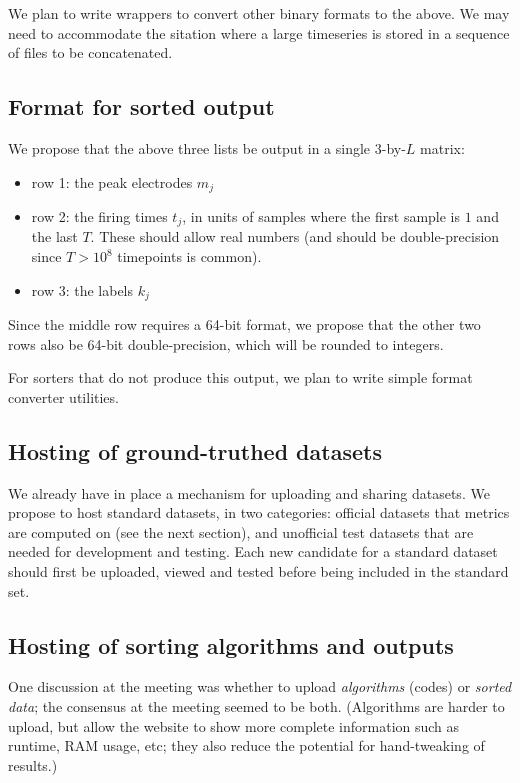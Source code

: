 \documentclass[10pt]{article}
\newcommand{\bi}{\begin{itemize}}
\newcommand{\ei}{\end{itemize}}
\begin{document}
We plan to write wrappers to convert other binary formats to the above.
We may need to
accommodate the sitation where a large timeseries is stored in a sequence of
files to be concatenated.

\subsection{Format for sorted output}

We propose that the above three lists be output in
a single $3$-by-$L$ matrix:

\bi
\item row 1: the peak electrodes $m_j$
\item row 2: the firing times $t_j$, in units of samples where
the first sample is $1$ and the last $T$. These should allow real numbers
(and should be double-precision since $T>10^8$ timepoints is common).
\item row 3: the labels $k_j$
\ei
  
Since the middle row requires a 64-bit format, we propose that the
other two rows also be 64-bit double-precision, which will be rounded
to integers.

For sorters that do not produce this output, we plan to
write simple format converter utilities.


\subsection{Hosting of ground-truthed datasets}

We already have in place a mechanism for uploading and sharing datasets.
We propose to host standard datasets, in two categories:
official datasets that metrics are computed on
(see the next section),
and unofficial test datasets that are needed for development and testing.
Each new candidate for a standard dataset should first be uploaded, viewed and tested before being included in the standard set.

\subsection{Hosting of sorting algorithms and outputs}

One discussion at the meeting was 
whether to upload {\em algorithms} (codes) or {\em sorted data};
the consensus at the meeting seemed to be both.
(Algorithms are harder to upload, but allow the website to show more complete
information such as runtime, RAM usage, etc; they also reduce the potential
for hand-tweaking of results.)
\end{document}
